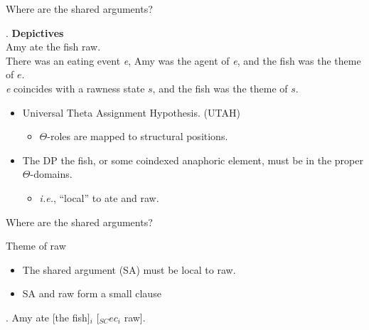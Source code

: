 \documentclass[Proposal]{subfiles}
\begin{document}
\begin{frame}
  {Where are the shared arguments?}

  \ex. \textbf{Depictives}\\
  {\rm Amy ate the fish raw.}\\
  \pause
  There was an eating event \textit{e}, Amy was the agent of \textit{e}, and \alert{the fish} was the theme of $e$.\\
  \textit{e} coincides with a rawness state $s$, and \alert{the fish} was the theme of $s$.

  \begin{itemize}
    \item Universal Theta Assignment Hypothesis. (UTAH)
      \begin{itemize}
	\item $\Theta$-roles are mapped to structural positions. \parencite{baker1988incorporation}
      \end{itemize}
    \item The DP {\rm the fish}, or some coindexed anaphoric element, must be in the proper $\Theta$-domains.
      \begin{itemize}
	\item \textit{i.e.}, ``local'' to {\rm ate} and {\rm raw}.
      \end{itemize}
  \end{itemize}
\end{frame}
\begin{frame}
  {Where are the shared arguments?}
  \begin{block}
    {Theme of {\rm raw}}
    \begin{itemize}
      \item The shared argument (SA) must be local to {\rm raw}.
	\pause
      \item SA and {\rm raw} form a small clause 
    \end{itemize}
  \end{block}
  \ex. Amy ate [the fish]$_i$ [$_{SC} ec_i$ raw].

\end{frame}
\end{document}
